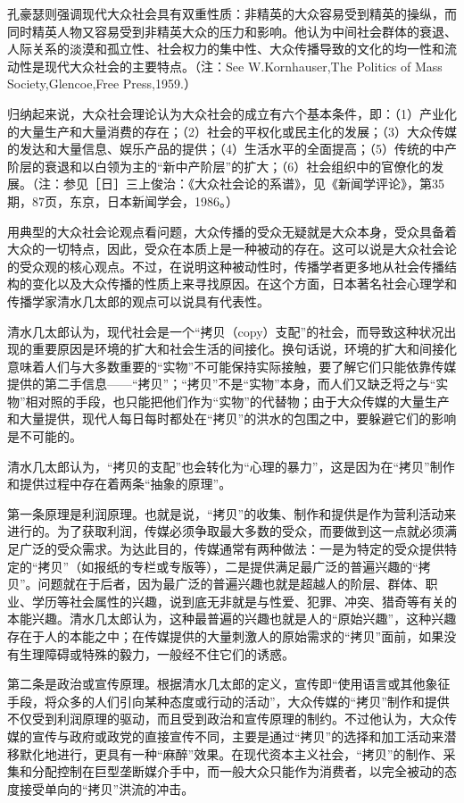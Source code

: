 \documentclass[UTF8,12pt]{ctexart}
\numberwithin{equation}{section} %
\numberwithin{figure}{section}
\numberwithin{table}{section}
\begin{document}
	孔豪瑟则强调现代大众社会具有双重性质：非精英的大众容易受到精英的操纵，而同时精英人物又容易受到非精英大众的压力和影响。他认为中间社会群体的衰退、人际关系的淡漠和孤立性、社会权力的集中性、大众传播导致的文化的均一性和流动性是现代大众社会的主要特点。（注：See W.Kornhauser,The Politics of Mass Society,Glencoe,Free Press,1959.）
	
	归纳起来说，大众社会理论认为大众社会的成立有六个基本条件，即：（1）产业化的大量生产和大量消费的存在；（2）社会的平权化或民主化的发展；（3）大众传媒的发达和大量信息、娱乐产品的提供；（4）生活水平的全面提高；（5）传统的中产阶层的衰退和以白领为主的“新中产阶层”的扩大；（6）社会组织中的官僚化的发展。（注：参见［日］三上俊治：《大众社会论的系谱》，见《新闻学评论》，第35期，87页，东京，日本新闻学会，1986。）
	
	
	用典型的大众社会论观点看问题，大众传播的受众无疑就是大众本身，受众具备着大众的一切特点，因此，受众在本质上是一种被动的存在。这可以说是大众社会论的受众观的核心观点。不过，在说明这种被动性时，传播学者更多地从社会传播结构的变化以及大众传播的性质上来寻找原因。在这个方面，日本著名社会心理学和传播学家清水几太郎的观点可以说具有代表性。
	
	清水几太郎认为，现代社会是一个“拷贝（copy）支配”的社会，而导致这种状况出现的重要原因是环境的扩大和社会生活的间接化。换句话说，环境的扩大和间接化意味着人们与大多数重要的“实物”不可能保持实际接触，要了解它们只能依靠传媒提供的第二手信息——“拷贝”；“拷贝”不是“实物”本身，而人们又缺乏将之与“实物”相对照的手段，也只能把他们作为“实物”的代替物；由于大众传媒的大量生产和大量提供，现代人每日每时都处在“拷贝”的洪水的包围之中，要躲避它们的影响是不可能的。
	
	清水几太郎认为，“拷贝的支配”也会转化为“心理的暴力”，这是因为在“拷贝”制作和提供过程中存在着两条“抽象的原理”。
	
	第一条原理是利润原理。也就是说，“拷贝”的收集、制作和提供是作为营利活动来进行的。为了获取利润，传媒必须争取最大多数的受众，而要做到这一点就必须满足广泛的受众需求。为达此目的，传媒通常有两种做法：一是为特定的受众提供特定的“拷贝”（如报纸的专栏或专版等），二是提供满足最广泛的普遍兴趣的“拷贝”。问题就在于后者，因为最广泛的普遍兴趣也就是超越人的阶层、群体、职业、学历等社会属性的兴趣，说到底无非就是与性爱、犯罪、冲突、猎奇等有关的本能兴趣。清水几太郎认为，这种最普遍的兴趣也就是人的“原始兴趣”，这种兴趣存在于人的本能之中；在传媒提供的大量刺激人的原始需求的“拷贝”面前，如果没有生理障碍或特殊的毅力，一般经不住它们的诱惑。
	
	第二条是政治或宣传原理。根据清水几太郎的定义，宣传即“使用语言或其他象征手段，将众多的人们引向某种态度或行动的活动”，大众传媒的“拷贝”制作和提供不仅受到利润原理的驱动，而且受到政治和宣传原理的制约。不过他认为，大众传媒的宣传与政府或政党的直接宣传不同，主要是通过“拷贝”的选择和加工活动来潜移默化地进行，更具有一种“麻醉”效果。在现代资本主义社会，“拷贝”的制作、采集和分配控制在巨型垄断媒介手中，而一般大众只能作为消费者，以完全被动的态度接受单向的“拷贝”洪流的冲击。
	
\end{document}
